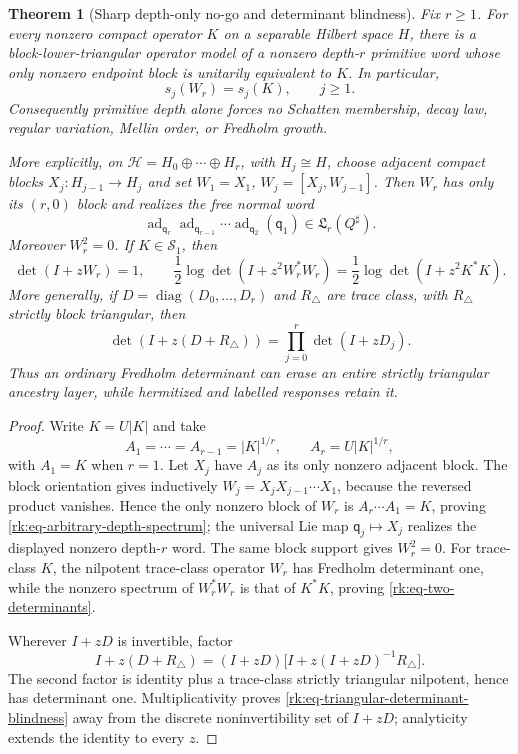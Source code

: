 \documentclass[10pt,reqno]{amsart}
\theoremstyle{plain}
\newtheorem{theorem}{Theorem}[section]
\theoremstyle{definition}
\theoremstyle{remark}
\begin{document}
\begin{theorem}[Sharp depth-only no-go and determinant blindness]
\label{rk:thm-sharp-depth-no-go}
Fix $r\ge1$.  For every nonzero compact operator $K$ on a separable
Hilbert space $H$, there is a block-lower-triangular operator model of a
nonzero depth-$r$ primitive word whose only nonzero endpoint block is
unitarily equivalent to $K$.  In particular,
\begin{equation}
 s_j(W_r)=s_j(K),\qquad j\ge1.
 \label{rk:eq-arbitrary-depth-spectrum}
\end{equation}
Consequently primitive depth alone forces no Schatten membership, decay
law, regular variation, Mellin order, or Fredholm growth.

More explicitly, on
$\mathcal H=H_0\oplus\cdots\oplus H_r$, with $H_j\cong H$, choose
adjacent compact blocks $X_j:H_{j-1}\to H_j$ and set
$W_1=X_1$, $W_j=[X_j,W_{j-1}]$.  Then $W_r$ has only its $(r,0)$ block and
realizes the free normal word
\[
 \operatorname{ad}_{\mathsf q_r}\operatorname{ad}_{\mathsf q_{r-1}}
 \cdots\operatorname{ad}_{\mathsf q_2}(\mathsf q_1)
 \in\mathfrak L_r(Q^\sharp).
\]
Moreover $W_r^2=0$.  If $K\in\mathcal S_1$, then
\begin{equation}
 \det(I+zW_r)=1,
 \qquad
 \frac12\log\det(I+z^2W_r^*W_r)
 =\frac12\log\det(I+z^2K^*K).
 \label{rk:eq-two-determinants}
\end{equation}
More generally, if
$D=\operatorname{diag}(D_0,\ldots,D_r)$ and $R_\triangle$ are trace
class, with $R_\triangle$ strictly block triangular, then
\begin{equation}
 \det(I+z(D+R_\triangle))
 =\prod_{j=0}^r\det(I+zD_j).
 \label{rk:eq-triangular-determinant-blindness}
\end{equation}
Thus an ordinary Fredholm determinant can erase an entire strictly
triangular ancestry layer, while hermitized and labelled responses retain it.
\end{theorem}

\begin{proof}
Write $K=U|K|$ and take
\[
 A_1=\cdots=A_{r-1}=|K|^{1/r},
 \qquad A_r=U|K|^{1/r},
\]
with $A_1=K$ when $r=1$.  Let $X_j$ have $A_j$ as its only nonzero
adjacent block.  The block orientation gives inductively
$W_j=X_jX_{j-1}\cdots X_1$, because the reversed product vanishes.  Hence
the only nonzero block of $W_r$ is $A_r\cdots A_1=K$, proving
\eqref{rk:eq-arbitrary-depth-spectrum}; the universal Lie map
$\mathsf q_j\mapsto X_j$ realizes the displayed nonzero depth-$r$ word.
The same block support gives $W_r^2=0$.  For trace-class $K$, the nilpotent
trace-class operator $W_r$ has Fredholm determinant one, while the nonzero
spectrum of $W_r^*W_r$ is that of $K^*K$, proving
\eqref{rk:eq-two-determinants}.

Wherever $I+zD$ is invertible, factor
\[
 I+z(D+R_\triangle)
 =(I+zD)\bigl[I+z(I+zD)^{-1}R_\triangle\bigr].
\]
The second factor is identity plus a trace-class strictly triangular
nilpotent, hence has determinant one.  Multiplicativity proves
\eqref{rk:eq-triangular-determinant-blindness} away from the discrete
noninvertibility set of $I+zD$; analyticity extends the identity to every
$z$.
\end{proof}
\end{document}
